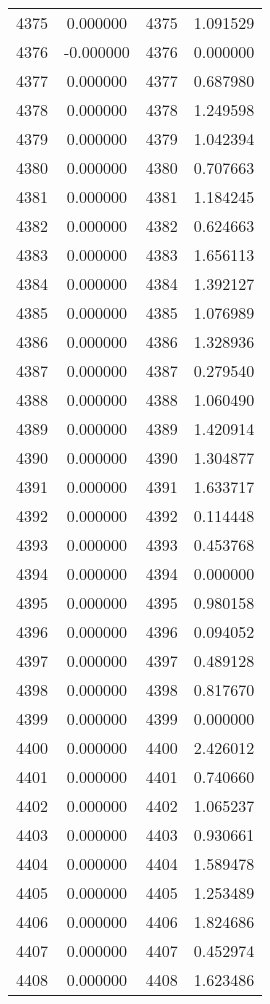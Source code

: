 \documentclass[12pt]{article}
\begin{document}
\begin{longtable}{@{}cccc@{}}
4375 & 0.000000 & 4375 & 1.091529 \\
4376 & -0.000000 & 4376 & 0.000000 \\
4377 & 0.000000 & 4377 & 0.687980 \\
4378 & 0.000000 & 4378 & 1.249598 \\
4379 & 0.000000 & 4379 & 1.042394 \\
4380 & 0.000000 & 4380 & 0.707663 \\
4381 & 0.000000 & 4381 & 1.184245 \\
4382 & 0.000000 & 4382 & 0.624663 \\
4383 & 0.000000 & 4383 & 1.656113 \\
4384 & 0.000000 & 4384 & 1.392127 \\
4385 & 0.000000 & 4385 & 1.076989 \\
4386 & 0.000000 & 4386 & 1.328936 \\
4387 & 0.000000 & 4387 & 0.279540 \\
4388 & 0.000000 & 4388 & 1.060490 \\
4389 & 0.000000 & 4389 & 1.420914 \\
4390 & 0.000000 & 4390 & 1.304877 \\
4391 & 0.000000 & 4391 & 1.633717 \\
4392 & 0.000000 & 4392 & 0.114448 \\
4393 & 0.000000 & 4393 & 0.453768 \\
4394 & 0.000000 & 4394 & 0.000000 \\
4395 & 0.000000 & 4395 & 0.980158 \\
4396 & 0.000000 & 4396 & 0.094052 \\
4397 & 0.000000 & 4397 & 0.489128 \\
4398 & 0.000000 & 4398 & 0.817670 \\
4399 & 0.000000 & 4399 & 0.000000 \\
4400 & 0.000000 & 4400 & 2.426012 \\
4401 & 0.000000 & 4401 & 0.740660 \\
4402 & 0.000000 & 4402 & 1.065237 \\
4403 & 0.000000 & 4403 & 0.930661 \\
4404 & 0.000000 & 4404 & 1.589478 \\
4405 & 0.000000 & 4405 & 1.253489 \\
4406 & 0.000000 & 4406 & 1.824686 \\
4407 & 0.000000 & 4407 & 0.452974 \\
4408 & 0.000000 & 4408 & 1.623486 \\

\end{longtable}
\end{document}
